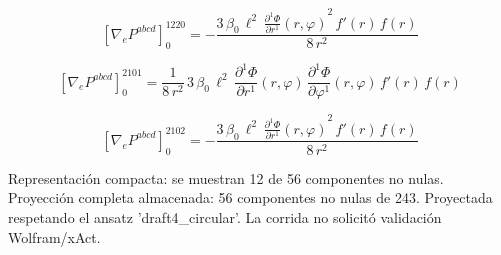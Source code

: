 \documentclass[11pt]{article}
\begin{document}
\par\smallskip
\begin{dmath*}[breakdepth={5}]
\left[\nabla_e P^{abcd}\right]_{0}^{1220} = -\frac{3\,\beta_{0}\,{\ell}^{2}\,{\frac{\partial^{1} \Phi}{\partial r^{1}}\!\left(r, \varphi\right)}^{2}\,f'\!\left(r\right)\,f\!\left(r\right)}{8\,{r}^{2}}
\end{dmath*}
\par\smallskip
\begin{dmath*}[breakdepth={5}]
\left[\nabla_e P^{abcd}\right]_{0}^{2101} = \frac{1}{8\,{r}^{2}}\,3\,\beta_{0}\,{\ell}^{2}\,\frac{\partial^{1} \Phi}{\partial r^{1}}\!\left(r, \varphi\right)\,\frac{\partial^{1} \Phi}{\partial \varphi^{1}}\!\left(r, \varphi\right)\,f'\!\left(r\right)\,f\!\left(r\right)
\end{dmath*}
\par\smallskip
\begin{dmath*}[breakdepth={5}]
\left[\nabla_e P^{abcd}\right]_{0}^{2102} = -\frac{3\,\beta_{0}\,{\ell}^{2}\,{\frac{\partial^{1} \Phi}{\partial r^{1}}\!\left(r, \varphi\right)}^{2}\,f'\!\left(r\right)\,f\!\left(r\right)}{8\,{r}^{2}}
\end{dmath*}
\par\smallskip
Representación compacta: se muestran 12 de 56 componentes no nulas.
Proyección completa almacenada: 56 componentes no nulas de 243. Proyectada respetando el ansatz 'draft4\_circular'. La corrida no solicitó validación Wolfram/xAct.\par\medskip
{}
\end{document}
